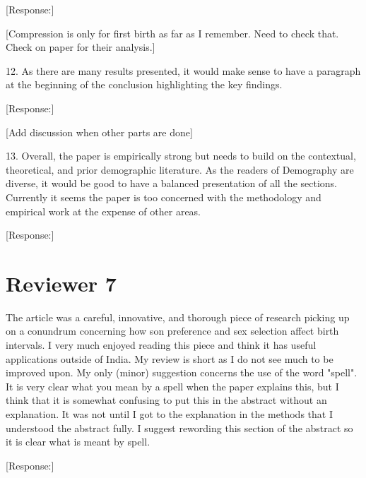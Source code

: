 \documentclass[letterpaper,12pt]{article}
\begin{document}
[Response:]

[Compression is only for first birth as far as I remember. Need to check that.
Check on paper for their analysis.]


12. As there are many results presented, it would make sense to have a
paragraph at the beginning of the conclusion highlighting the key
findings.

[Response:]

[Add discussion when other parts are done]

13. Overall, the paper is empirically strong but needs to build on the
contextual, theoretical, and prior demographic literature. As the
readers of Demography are diverse, it would be good to have a balanced
presentation of all the sections. Currently it seems the paper is too
concerned with the methodology and empirical work at the expense of
other areas.

[Response:]

\newpage

\section*{Reviewer 7}

The article was a careful, innovative, and thorough piece of research
picking up on a conundrum concerning how son preference and sex
selection affect birth intervals. I very much enjoyed reading this piece
and think it has useful applications outside of India.  My review is
short as I do not see much to be improved upon.  My only (minor)
suggestion concerns the use of the word "spell".  It is very clear what
you mean by a spell when the paper explains this, but I think that it is
somewhat confusing to put this in the abstract without an explanation. 
It was not until I got to the explanation in the methods that I
understood the abstract fully.  I suggest rewording this section of the
abstract so it is clear what is meant by spell.

[Response:]



\newpage


\end{document}
